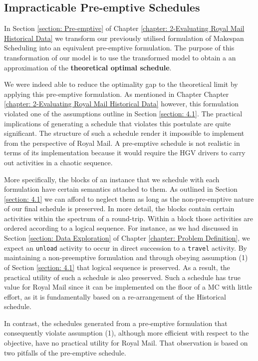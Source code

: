 \subsection*{Impracticable Pre-emptive Schedules}
In Section \ref{section: Pre-emptive} of Chapter \ref{chapter: 2-Evaluating Royal Mail Historical Data} we transform our previously utilised formulation of Makespan Scheduling into an equivalent pre-emptive formulation. The purpose of this transformation of our model is to use the transformed model to obtain a an approximation of the \textbf{theoretical optimal schedule}. 

\vspace{\baselineskip}
\noindent
We were indeed able to reduce the optimality gap to the theoretical limit by applying this pre-emptive formulation. As mentioned in Chapter Chapter \ref{chapter: 2-Evaluating Royal Mail Historical Data} however, this formulation violated one of the assumptions outline in Section \ref{section: 4.1}. The practical implications of generating a schedule that violates this postulate are quite significant. The structure of such a schedule render it impossible to implement from the perspective of Royal Mail. A pre-emptive schedule is not realistic in terms of its implementation because it would require the HGV drivers to carry out activities in a chaotic sequence. 

\vspace{\baselineskip}
\noindent
More specifically, the blocks of an instance that we schedule with each formulation have certain semantics attached to them. As outlined in Section \ref{section: 4.1} we can afford to neglect them as long as the non-pre-emptive nature of our final schedule is preserved. In more detail, the blocks contain certain activities within the spectrum of a round-trip. Within a block those activities are ordered according to a logical sequence. For instance, as we had discussed in Section \ref{section: Data Exploration} of Chapter \ref{chapter: Problem Definition}, we expect an \texttt{unload} activity to occur in direct succession to a \texttt{travel} activity. By maintaining a non-preemptive formulation and through obeying assumption (1) of Section \ref{section: 4.1} that logical sequence is preserved. As a result, the practical utility of such a schedule is also preserved. Such a schedule has true value for Royal Mail since it can be implemented on the floor of a MC with little effort, as it is fundamentally based on a re-arrangement of the Historical schedule.

\vspace{\baselineskip}
\noindent
In contrast, the schedules generated from a pre-emptive formulation that consequently violate assumption (1), although more efficient with respect to the objective, have no practical utility for Royal Mail. That observation is based on two pitfalls of the pre-emptive schedule.

